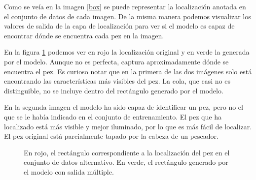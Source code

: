 Como se veía en la imagen \ref{box} se puede representar la localización anotada
en el conjunto de datos de cada imagen. De la misma manera podemos visualizar
los valores de salida de la capa de localización para ver si el modelo es capaz
de encontrar dónde se encuentra cada pez en la imagen.

En la figura \ref{predicted_boxes_1} podemos ver en rojo la localización original
y en verde la generada por el modelo. Aunque no es perfecta, captura
aproximadamente dónde se encuentra el pez. Es curioso notar que en la primera de
las dos imágenes solo está encontrando las características más visibles del pez.
La cola, que casi no es distinguible, no se incluye dentro del rectángulo
generado por el modelo.

En la segunda imagen el modelo ha sido capaz de identificar un pez, pero no el que
se le había indicado en el conjunto de entrenamiento. El pez que ha localizado
está más visible y mejor iluminado, por lo que es más fácil de localizar. El pez
original está parcialmente tapado por la cabeza de un pescador.

\begin{figure}
  \caption{En rojo, el rectángulo correspondiente a la localización del pez en
  el conjunto de datos alternativo. En verde, el rectángulo generado por el
  modelo con salida múltiple.}
\label{predicted_boxes_1}
\end{figure}


